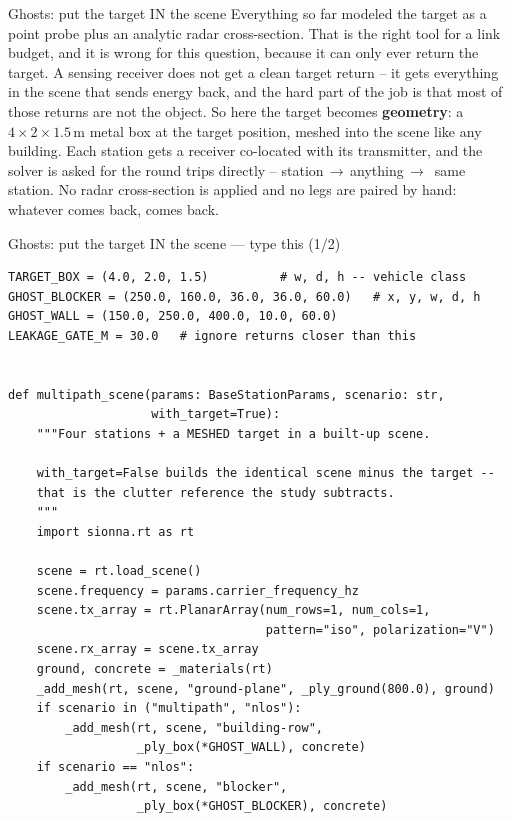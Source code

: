 \documentclass[10pt]{beamer}
\begin{document}
\begin{frame}{Ghosts: put the target IN the scene}
  Everything so far modeled the target as a point probe
  plus an analytic radar cross-section. That is the right
  tool for a link budget, and it is wrong for this
  question, because it can only ever return the target.
  A sensing receiver does not get a clean target return --
  it gets everything in the scene that sends energy back,
  and the hard part of the job is that most of those
  returns are not the object. So here the target becomes
  \textbf{geometry}: a $4{\times}2{\times}1.5$\,m metal
  box at the target position, meshed into the scene like
  any building. Each station gets a receiver co-located
  with its transmitter, and the solver is asked for the
  round trips directly -- station\,$\to$\,anything\,$\to$
  \,same station. No radar cross-section is applied and no
  legs are paired by hand: whatever comes back, comes back.
\end{frame}

\begin{frame}[fragile]{Ghosts: put the target IN the scene --- type this (1/2)}
\begin{lstlisting}[basicstyle=\ttfamily\tiny]
TARGET_BOX = (4.0, 2.0, 1.5)          # w, d, h -- vehicle class
GHOST_BLOCKER = (250.0, 160.0, 36.0, 36.0, 60.0)   # x, y, w, d, h
GHOST_WALL = (150.0, 250.0, 400.0, 10.0, 60.0)
LEAKAGE_GATE_M = 30.0   # ignore returns closer than this


def multipath_scene(params: BaseStationParams, scenario: str,
                    with_target=True):
    """Four stations + a MESHED target in a built-up scene.

    with_target=False builds the identical scene minus the target --
    that is the clutter reference the study subtracts.
    """
    import sionna.rt as rt

    scene = rt.load_scene()
    scene.frequency = params.carrier_frequency_hz
    scene.tx_array = rt.PlanarArray(num_rows=1, num_cols=1,
                                    pattern="iso", polarization="V")
    scene.rx_array = scene.tx_array
    ground, concrete = _materials(rt)
    _add_mesh(rt, scene, "ground-plane", _ply_ground(800.0), ground)
    if scenario in ("multipath", "nlos"):
        _add_mesh(rt, scene, "building-row",
                  _ply_box(*GHOST_WALL), concrete)
    if scenario == "nlos":
        _add_mesh(rt, scene, "blocker",
                  _ply_box(*GHOST_BLOCKER), concrete)
\end{lstlisting}
\end{frame}
\end{document}
